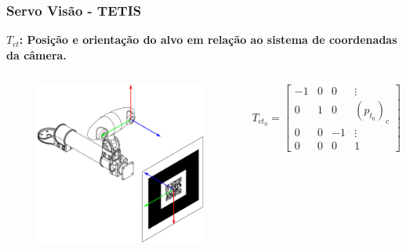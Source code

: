 \documentclass{beamer}
\newcommand\m[1]{\begin{bmatrix}#1\end{bmatrix}}
\begin{document}
\begin{frame}
\frametitle{Servo Visão - TETIS}
\textbf{$T_{ct}$: Posição e orientação do alvo em relação ao sistema de coordenadas da câmera.}
\begin{columns}[c]
\begin{figure}
\includegraphics[width=\linewidth]{./img/camera_target.eps}
\end{figure}
\begin{equation}
T_{ct_0} = \m{
	-1 & 0 & 0  &\vdots \\
	0 & 1 & 0  & (p_{t_0})_c    \\
	0 & 0 & -1 &\vdots \\
	0 & 0 & 0 & 1
}
\end{equation}
\end{columns}
\end{frame}
\end{document}

